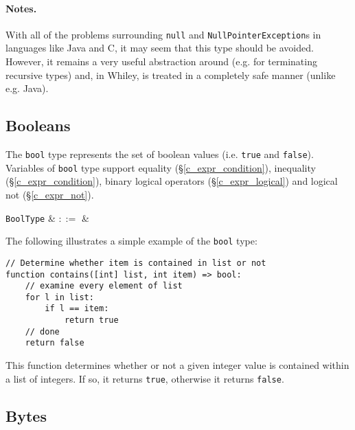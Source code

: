 \paragraph{Notes.}  With all of the problems surrounding \lstinline{null} and \lstinline{NullPointerException}s in languages like Java and C, it may seem that this type should be avoided. However, it remains a very useful abstraction around (e.g. for terminating recursive types) and, in Whiley, is treated in a completely safe manner (unlike e.g. Java).


\subsection{Booleans}
\label{c_types_bool}

The \lstinline{bool} type represents the set of boolean values (i.e. \lstinline{true} and \lstinline{false}).  Variables of \lstinline{bool} type support equality (\S\ref{c_expr_condition}), inequality (\S\ref{c_expr_condition}), binary logical operators (\S\ref{c_expr_logical}) and logical not (\S\ref{c_expr_not}).

\begin{syntax}
 \verb+BoolType+ & $::=$ &  \\
\end{syntax}

\noindent The following illustrates a simple example of the \lstinline{bool} type:

\begin{lstlisting}
// Determine whether item is contained in list or not
function contains([int] list, int item) => bool:
    // examine every element of list
    for l in list:
        if l == item:
            return true
    // done
    return false
\end{lstlisting}
This function determines whether or not a given integer value is contained within a list of integers.  If so, it returns \lstinline{true}, otherwise it returns \lstinline{false}.


\subsection{Bytes}
\label{c_types_byte}


